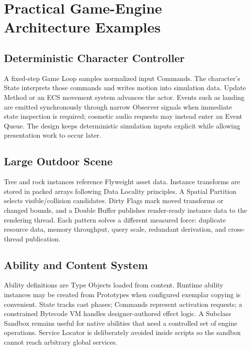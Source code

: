 \documentclass[11pt]{article}
\begin{document}
\section{Practical Game-Engine Architecture Examples}\label{sec:examples}
\subsection{Deterministic Character Controller}
A fixed-step Game Loop samples normalized input Commands. The character's State interprets those commands and writes motion into simulation data. Update Method or an ECS movement system advances the actor. Events such as landing are emitted synchronously through narrow Observer signals when immediate state inspection is required; cosmetic audio requests may instead enter an Event Queue. The design keeps deterministic simulation inputs explicit while allowing presentation work to occur later.

\subsection{Large Outdoor Scene}
Tree and rock instances reference Flyweight asset data. Instance transforms are stored in packed arrays following Data Locality principles. A Spatial Partition selects visible/collision candidates. Dirty Flags mark moved transforms or changed bounds, and a Double Buffer publishes render-ready instance data to the rendering thread. Each pattern solves a different measured force: duplicate resource data, memory throughput, query scale, redundant derivation, and cross-thread publication.

\subsection{Ability and Content System}
Ability definitions are Type Objects loaded from content. Runtime ability instances may be created from Prototypes when configured exemplar copying is convenient. State tracks cast phases; Commands represent activation requests; a constrained Bytecode VM handles designer-authored effect logic. A Subclass Sandbox remains useful for native abilities that need a controlled set of engine operations. Service Locator is deliberately avoided inside scripts so the sandbox cannot reach arbitrary global services.
\end{document}
